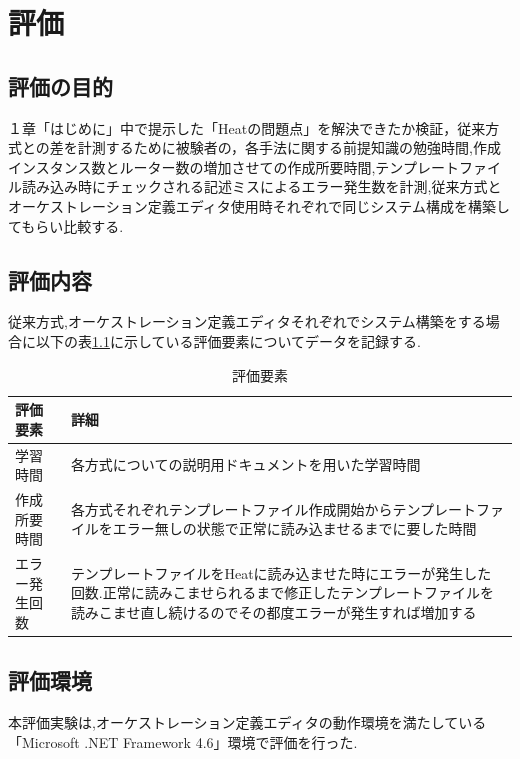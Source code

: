 \documentclass[mingoth]{kut-paper}		%
\begin{document}
\chapter{評価}
	\section{評価の目的}
	１章「はじめに」中で提示した「Heatの問題点」を解決できたか検証，従来方式との差を計測するために被験者の，各手法に関する前提知識の勉強時間,作成インスタンス数とルーター数の増加させての作成所要時間,テンプレートファイル読み込み時にチェックされる記述ミスによるエラー発生数を計測,従来方式とオーケストレーション定義エディタ使用時それぞれで同じシステム構成を構築してもらい比較する.
	\section{評価内容}
	従来方式,オーケストレーション定義エディタそれぞれでシステム構築をする場合に以下の表\ref{table:5}に示している評価要素についてデータを記録する.
	\begin{table}[H]
		\begin{center}
			\caption{評価要素}
			\label{table:5}
			\begin{tabular}{|p{5cm}|p{7cm}|}\hline
				評価要素 & 詳細\\ \hline \hline
				学習時間 & 各方式についての説明用ドキュメントを用いた学習時間\\ \hline
				作成所要時間 & 各方式それぞれテンプレートファイル作成開始からテンプレートファイルをエラー無しの状態で正常に読み込ませるまでに要した時間\\ \hline
				エラー発生回数 & テンプレートファイルをHeatに読み込ませた時にエラーが発生した回数.正常に読みこませられるまで修正したテンプレートファイルを読みこませ直し続けるのでその都度エラーが発生すれば増加する\\ \hline
			\end{tabular}
		\end{center}
	\end{table}
	\section{評価環境}
	本評価実験は,オーケストレーション定義エディタの動作環境を満たしている「Microsoft .NET Framework 4.6」環境で評価を行った.
	
\end{document}
